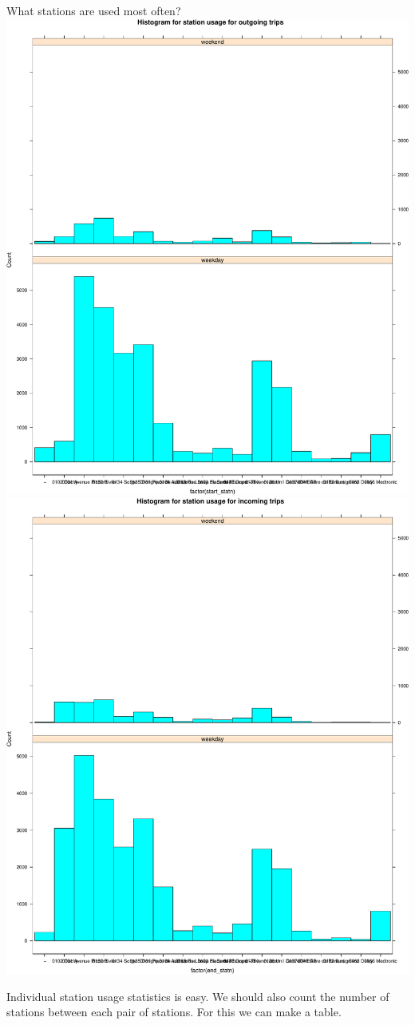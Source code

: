 \documentclass[]{article}
\begin{document}
What stations are used most often?
\includegraphics{velopassBirdsEye_files/figure-latex/stationUsage-1.pdf}
\includegraphics{velopassBirdsEye_files/figure-latex/stationUsage-2.pdf}

Individual station usage statistics is easy. We should also count the
number of stations between each pair of stations. For this we can make a
table.
\end{document}
